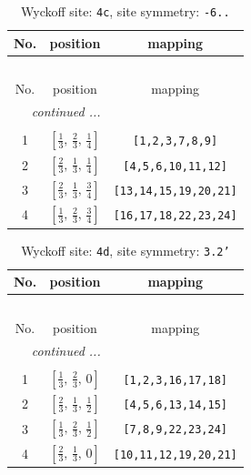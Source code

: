 \documentclass[fleqn,8pt]{jsarticle}
\begin{document}
\renewcommand{\arraystretch}{1.2}
\begin{longtable}{ccc}
\caption{Wyckoff site: {\tt 4c}, site symmetry: {\tt -6..}}
 \\
 \hline \hline
No. & position & mapping \\ \hline \endfirsthead

\multicolumn{2}{l}{\tablename\ \thetable{}} \\
 \hline \hline
No. & position & mapping \\ \hline \endhead

 \hline \hline
\multicolumn{2}{r}{\footnotesize\it continued ...} \\ \endfoot

 \hline \hline
\multicolumn{2}{r}{} \\ \endlastfoot

1 & $\left[ \frac{1}{3},\, \frac{2}{3},\, \frac{1}{4} \right]$ & {\tt [1,2,3,7,8,9]} \\ \hline
2 & $\left[ \frac{2}{3},\, \frac{1}{3},\, \frac{1}{4} \right]$ & {\tt [4,5,6,10,11,12]} \\ \hline
3 & $\left[ \frac{2}{3},\, \frac{1}{3},\, \frac{3}{4} \right]$ & {\tt [13,14,15,19,20,21]} \\ \hline
4 & $\left[ \frac{1}{3},\, \frac{2}{3},\, \frac{3}{4} \right]$ & {\tt [16,17,18,22,23,24]} \\
\end{longtable}
\renewcommand{\arraystretch}{1.2}
\begin{longtable}{ccc}
\caption{Wyckoff site: {\tt 4d}, site symmetry: {\tt 3.2'}}
 \\
 \hline \hline
No. & position & mapping \\ \hline \endfirsthead

\multicolumn{2}{l}{\tablename\ \thetable{}} \\
 \hline \hline
No. & position & mapping \\ \hline \endhead

 \hline \hline
\multicolumn{2}{r}{\footnotesize\it continued ...} \\ \endfoot

 \hline \hline
\multicolumn{2}{r}{} \\ \endlastfoot

1 & $\left[ \frac{1}{3},\, \frac{2}{3},\, 0 \right]$ & {\tt [1,2,3,16,17,18]} \\ \hline
2 & $\left[ \frac{2}{3},\, \frac{1}{3},\, \frac{1}{2} \right]$ & {\tt [4,5,6,13,14,15]} \\ \hline
3 & $\left[ \frac{1}{3},\, \frac{2}{3},\, \frac{1}{2} \right]$ & {\tt [7,8,9,22,23,24]} \\ \hline
4 & $\left[ \frac{2}{3},\, \frac{1}{3},\, 0 \right]$ & {\tt [10,11,12,19,20,21]} \\
\end{longtable}
\end{document}
